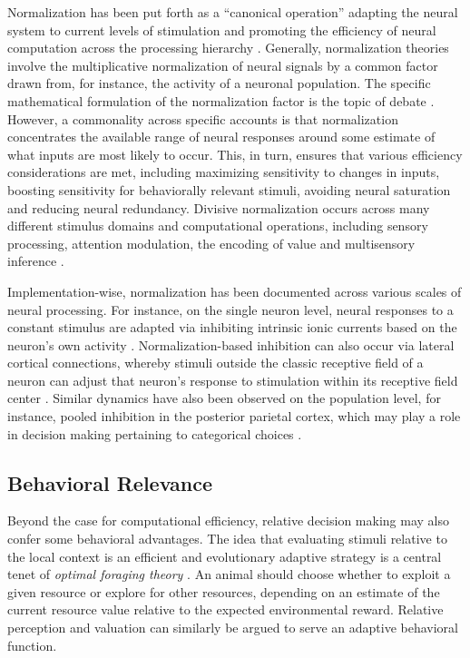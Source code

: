 \documentclass[a4paper, nobind]{templates/ociamthesis}
\begin{document}
Normalization has been put forth as a ``canonical operation'' adapting the neural system to current levels of stimulation and promoting the efficiency of neural computation across the processing hierarchy \autocite{carandini2012}. Generally, normalization theories involve the multiplicative normalization of neural signals by a common factor drawn from, for instance, the activity of a neuronal population. The specific mathematical formulation of the normalization factor is the topic of debate \autocites[e.g.~the weighted sum of inputs as in][]{carandini2012,louie2013}[or the range of inputs as in][]{soltani2012}. However, a commonality across specific accounts is that normalization concentrates the available range of neural responses around some estimate of what inputs are most likely to occur. This, in turn, ensures that various efficiency considerations are met, including maximizing sensitivity to changes in inputs, boosting sensitivity for behaviorally relevant stimuli, avoiding neural saturation and reducing neural redundancy. Divisive normalization occurs across many different stimulus domains and computational operations, including sensory processing, attention modulation, the encoding of value and multisensory inference \autocite{carandini2012}.

Implementation-wise, normalization has been documented across various scales of neural processing. For instance, on the single neuron level, neural responses to a constant stimulus are adapted via inhibiting intrinsic ionic currents based on the neuron's own activity \autocite[inhibitory feedback loop,][]{benda2021}. Normalization-based inhibition can also occur via lateral cortical connections, whereby stimuli outside the classic receptive field of a neuron can adjust that neuron's response to stimulation within its receptive field center \autocite{stemmler1995}. Similar dynamics have also been observed on the population level, for instance, pooled inhibition in the posterior parietal cortex, which may play a role in decision making pertaining to categorical choices \autocite{wang2002}.

\hypertarget{behavioral-relevance}{%
\subsection{Behavioral Relevance}\label{behavioral-relevance}}

Beyond the case for computational efficiency, relative decision making may also confer some behavioral advantages. The idea that evaluating stimuli relative to the local context is an efficient and evolutionary adaptive strategy is a central tenet of \emph{optimal foraging theory} \autocite{stephens1986,kolling2012}. An animal should choose whether to exploit a given resource or explore for other resources, depending on an estimate of the current resource value relative to the expected environmental reward. Relative perception and valuation can similarly be argued to serve an adaptive behavioral function.
\end{document}
